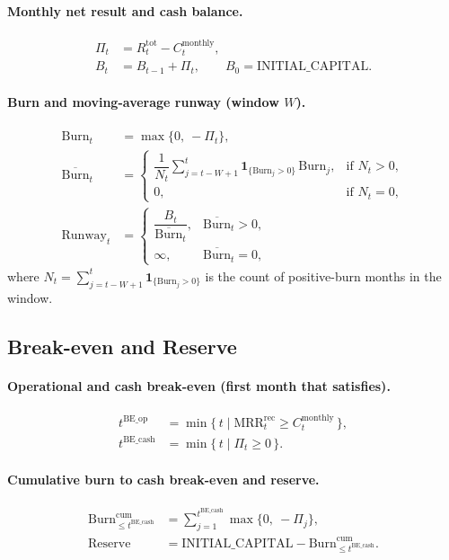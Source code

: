 \documentclass[11pt, a4paper, oneside]{article}
\begin{document}
\paragraph{Monthly net result and cash balance.}
\begin{align}
\Pi_t &= R^{\mathrm{tot}}_t - C^{\mathrm{monthly}}_t,\\
B_t &= B_{t-1} + \Pi_t, \qquad B_0 = \text{INITIAL\_CAPITAL}.
\end{align}

\paragraph{Burn and moving-average runway (window $W$).}
\begin{align}
\mathrm{Burn}_t &= \max\{0,\ -\Pi_t\},\\
\overline{\mathrm{Burn}}_t 
  &= 
  \begin{cases}
    \dfrac{1}{N_t} \sum_{j=t-W+1}^{t} \mathbf{1}_{\{\mathrm{Burn}_j>0\}}\, \mathrm{Burn}_j, & \text{if } N_t>0,\\[6pt]
    0, & \text{if } N_t=0,
  \end{cases}\\
\mathrm{Runway}_t 
  &= 
  \begin{cases}
    \dfrac{B_t}{\overline{\mathrm{Burn}}_t}, & \overline{\mathrm{Burn}}_t > 0,\\[6pt]
    \infty, & \overline{\mathrm{Burn}}_t = 0,
  \end{cases}
\end{align}
where $N_t=\sum_{j=t-W+1}^{t}\mathbf{1}_{\{\mathrm{Burn}_j>0\}}$ is the count of positive-burn months in the window.

\subsection{Break-even and Reserve}
\paragraph{Operational and cash break-even (first month that satisfies).}
\begin{align}
t^{\mathrm{BE\_op}} 
  &= \min\{\, t \mid \mathrm{MRR}^{\mathrm{rec}}_t \ge C^{\mathrm{monthly}}_t \,\},\\
t^{\mathrm{BE\_cash}} 
  &= \min\{\, t \mid \Pi_t \ge 0 \,\}.
\end{align}

\paragraph{Cumulative burn to cash break-even and reserve.}
\begin{align}
\mathrm{Burn}^{\mathrm{cum}}_{\le t^{\mathrm{BE\_cash}}} 
  &= \sum_{j=1}^{t^{\mathrm{BE\_cash}}} \max\{0,\ -\Pi_j\},\\
\mathrm{Reserve}
  &= \text{INITIAL\_CAPITAL} - \mathrm{Burn}^{\mathrm{cum}}_{\le t^{\mathrm{BE\_cash}}}.
\end{align}
\end{document}
